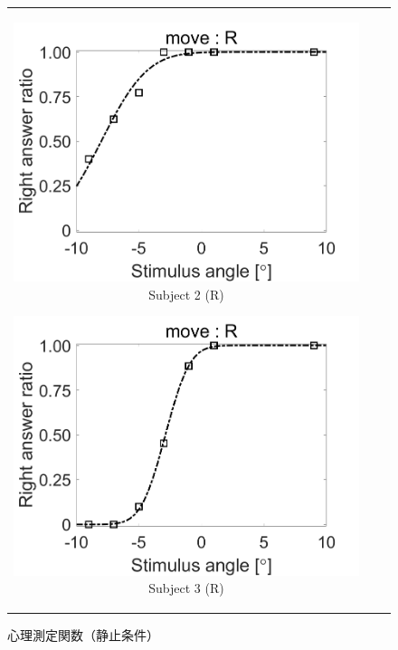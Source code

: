 \documentclass[12pt,a4j]{jsarticle}
\renewcommand{\ }{\hspace{1zw}}
\begin{document}
\begin{figure}[htbp]
\begin{tabular}{ccc}
\begin{minipage}{0.33\columnwidth}
            \includegraphics[width=\columnwidth]{./figure/R_niitsuma.png}
            Subject 2 (R)
        \end{minipage}
        \begin{minipage}{0.33\columnwidth}
            \centering
            \includegraphics[width=\columnwidth]{./figure/R_oikawa.png}
            Subject 3 (R)
        \end{minipage}
    \end{tabular}
    \caption{心理測定関数（静止条件）}
    \label{pf_v}
\end{figure}
\end{document}
